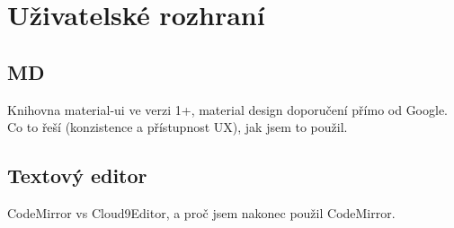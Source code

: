 
\section{Uživatelské rozhraní}

\subsection{MD}

Knihovna material-ui ve verzi 1+, material design doporučení přímo od Google.
Co to řeší (konzistence a přístupnost UX), jak jsem to použil.

\subsection{Textový editor}

CodeMirror vs Cloud9Editor, a proč jsem nakonec použil CodeMirror.


